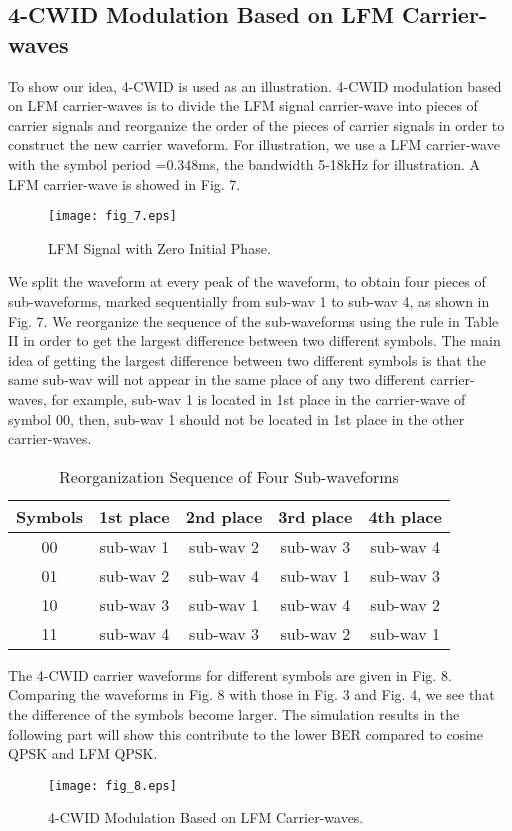 \documentclass[journal]{IEEEtran}
\begin{document}
\subsection{4-CWID Modulation Based on LFM Carrier-waves}
To show our idea, 4-CWID is used as an illustration. 4-CWID
modulation based on LFM carrier-waves is to divide the LFM signal
carrier-wave into pieces of carrier signals and reorganize the order
of the pieces of carrier signals in order to construct the new
carrier waveform. For illustration, we use a LFM carrier-wave with
the symbol period =0.348ms, the bandwidth 5-18kHz for
illustration. A LFM carrier-wave is showed in Fig. 7.
\begin{figure}[!t]
\centering
\texttt{[image: fig\_7.eps]}
\caption{LFM Signal with Zero Initial Phase.} \label{fig_sim}
\end{figure}
We split the waveform at every peak of the waveform, to obtain four
pieces of sub-waveforms, marked sequentially from sub-wav 1 to
sub-wav 4, as shown in Fig. 7. We reorganize the sequence of the
sub-waveforms using the rule in Table II in order to get the largest
difference between two different symbols. The main idea of getting
the largest difference between two different symbols is that the
same sub-wav will not appear in the same place of any two different
carrier-waves, for example, sub-wav 1 is located in 1st place in the
carrier-wave of symbol 00, then, sub-wav 1 should not be located in
1st place in the other carrier-waves.
\begin{table}[!t]
\renewcommand{\arraystretch}{1.3}
\caption{Reorganization Sequence of Four Sub-waveforms}
\label{table_example} \centering
\begin{tabular}{c||c||c||c||c}
\hline
\bfseries Symbols & \bfseries 1st place & \bfseries 2nd place & \bfseries 3rd place & \bfseries 4th place\\
\hline\hline
00            & sub-wav 1         & sub-wav 2       & sub-wav 3       & sub-wav 4\\
01            & sub-wav 2         & sub-wav 4       & sub-wav 1       & sub-wav 3\\
10            & sub-wav 3         & sub-wav 1       & sub-wav 4       & sub-wav 2\\
11            & sub-wav 4         & sub-wav 3       & sub-wav 2       & sub-wav 1\\
\hline
\end{tabular}
\end{table}

The 4-CWID carrier waveforms for different symbols are given in Fig.
8. Comparing the waveforms in Fig. 8 with those in Fig. 3 and Fig.
4, we see that the difference of the symbols become larger. The
simulation results in the following part will show this contribute
to the lower BER compared to cosine QPSK and LFM QPSK.
\begin{figure}[!t]
\centering
\texttt{[image: fig\_8.eps]}
\caption{4-CWID Modulation Based on LFM Carrier-waves.}
\label{fig_sim}
\end{figure}
\end{document}
